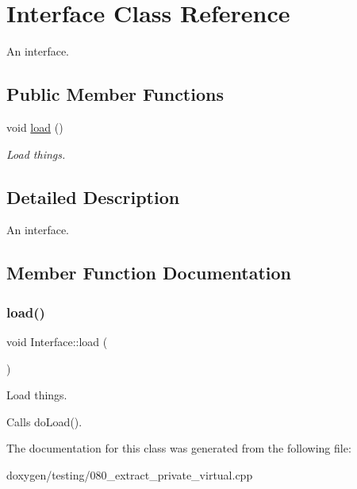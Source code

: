 \hypertarget{class_interface}{}\section{Interface Class Reference}
\label{class_interface}


An interface.  


\subsection*{Public Member Functions}
\begin{DoxyCompactItemize}
\item 
void \mbox{\hyperlink{class_interface_ab58d3008a7001cbb47f2fa5a5a1aeefa}{load}} ()
\begin{DoxyCompactList}\small\item\em Load things. \end{DoxyCompactList}\end{DoxyCompactItemize}


\subsection{Detailed Description}
An interface. 

\subsection{Member Function Documentation}
\mbox{\label{class_interface_ab58d3008a7001cbb47f2fa5a5a1aeefa}} 
\subsubsection{\texorpdfstring{load()}{load()}}
{\footnotesize\ttfamily void Interface\+::load (\begin{DoxyParamCaption}{ }\end{DoxyParamCaption})}



Load things. 

Calls do\+Load(). 

The documentation for this class was generated from the following file\+:\begin{DoxyCompactItemize}
\item 
doxygen/testing/080\+\_\+extract\+\_\+private\+\_\+virtual.\+cpp\end{DoxyCompactItemize}
